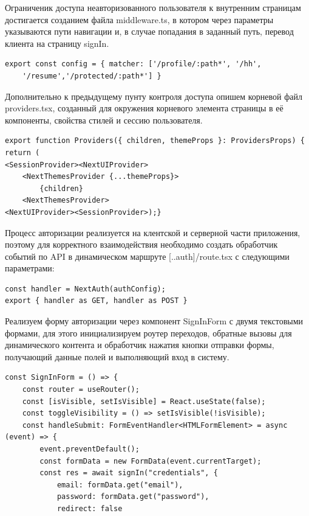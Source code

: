 \documentclass[master, och, pract]{SCWorks}
\begin{document}
Ограниченик доступа неавторизованного пользователя к внутренним страницам достигается созданием файла middleware.ts, в котором через параметры указываются пути навигации и, в случае попадания в заданный путь, перевод клиента на страницу signIn.
\begin{verbatim}
export const config = { matcher: ['/profile/:path*', '/hh', 
    '/resume','/protected/:path*'] }
\end{verbatim}

Дополнительно к предыдущему пунту контроля доступа опишем корневой файл providers.tsx, созданный для окружения корневого элемента страницы в её компоненты, свойства стилей и сессию пользователя.
\begin{verbatim}
export function Providers({ children, themeProps }: ProvidersProps) {
return (
<SessionProvider><NextUIProvider>
    <NextThemesProvider {...themeProps}>
        {children}
    <NextThemesProvider>
<NextUIProvider><SessionProvider>);}    
\end{verbatim}

Процесс авторизации реализуется на клентской и серверной части приложения, поэтому для корректного взаимодействия необходимо создать обработчик событий по API в динамическом маршруте [..auth]/route.tsx с следующими параметрами:
\begin{verbatim}
const handler = NextAuth(authConfig);
export { handler as GET, handler as POST }
\end{verbatim}

Реализуем форму авторизации через компонент SignInForm с двумя текстовыми формами, для этого
инициализируем роутер переходов, обратные вызовы для динамического контента и обработчик нажатия кнопки отправки формы, получающий данные полей и выполняющий вход в систему.
\begin{verbatim}
const SignInForm = () => {
    const router = useRouter();
    const [isVisible, setIsVisible] = React.useState(false);
    const toggleVisibility = () => setIsVisible(!isVisible);
    const handleSubmit: FormEventHandler<HTMLFormElement> = async (event) => {
        event.preventDefault();
        const formData = new FormData(event.currentTarget);
        const res = await signIn("credentials", {
            email: formData.get("email"),
            password: formData.get("password"),
            redirect: false
\end{verbatim}
\end{document}
